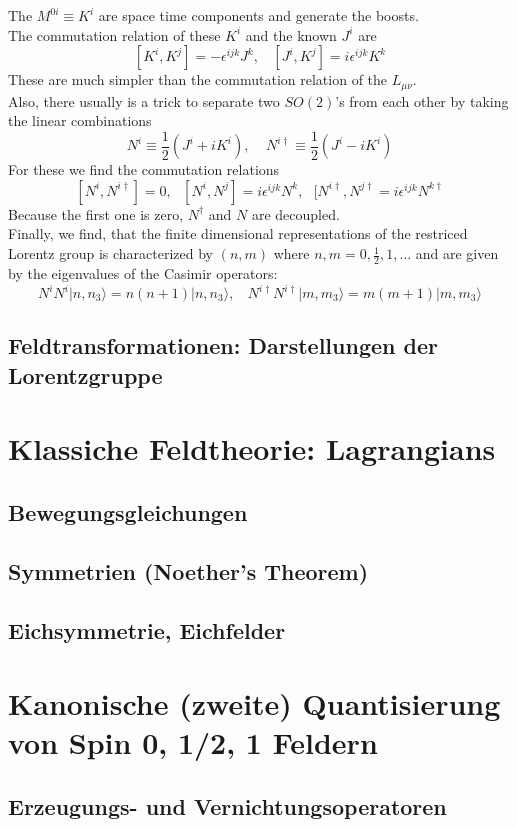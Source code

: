 \documentclass{include/thesisclass}
\newcommand{\rk}{\rangle}
\newcommand{\eps}{\epsilon}
\begin{document}
The $M^{0i} \equiv K^i$ are space time components and generate the boosts.\\
The commutation relation of these $K^i$ and the known $J^i$ are
\[ [K^i, K^j] = - \eps^{ijk} J^k, ~~~~ [J^i, K^j] = i \eps^{ijk} K^k\]
These are much simpler than the commutation relation of the $L_{\mu\nu}$.\\
Also, there usually is a trick to separate two $SO(2)$'s from each other by taking the linear combinations
\[N^i \equiv \frac{1}{2}(J^i + i K^i), ~~~~~ N^{i\dagger} \equiv \frac{1}{2} ( J^i - i K^i)\]
For these we find the commutation relations
\[ [N^i, N^{i\dagger}] = 0, ~~~ [N^i, N^j] = i \eps^{ijk} N^k, ~~~ [N^{i\dagger}, N^{j\dagger} = i \eps^{ijk} N^{k\dagger}\]
Because the first one is zero, $N^\dagger$ and $N$ are decoupled.\\
Finally, we find, that the finite dimensional representations of the restriced Lorentz group is characterized by $(n,m)$ where $n,m = 0,  \frac{1}{2}, 1, \ldots$ and are given by the eigenvalues of the Casimir operators:
\[N^iN^i|n,n_3\rk = n(n+1)|n,n_3\rk, ~~~~ N^{i\dagger}N^{i\dagger}|m,m_3\rk = m(m+1)|m,m_3\rk\]


\section{Feldtransformationen: Darstellungen der Lorentzgruppe}

\chapter{Klassiche Feldtheorie: Lagrangians}
\section{Bewegungsgleichungen}
\section{Symmetrien (Noether's Theorem)}
\section{Eichsymmetrie, Eichfelder}

\chapter{Kanonische (zweite) Quantisierung von Spin 0, 1/2, 1 Feldern}
\section{Erzeugungs- und Vernichtungsoperatoren}
\end{document}
